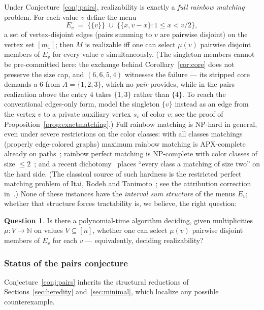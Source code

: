 \documentclass[11pt]{article}
\theoremstyle{definition}
\newtheorem{question}[theorem]{Question}
\theoremstyle{remark}
\newcommand{\N}{\mathbb{N}}
\newcommand{\intv}[1]{[#1]}
\begin{document}
Under Conjecture~\ref{conj:pairs}, realizability is exactly a \emph{full rainbow
matching} problem. For each value $v$ define the menu
\[
E_v \;=\; \bigl\{\{v\}\bigr\}\;\cup\;\bigl\{\{x,v-x\} : 1\le x<v/2\bigr\},
\]
a set of vertex-disjoint edges (pairs summing to $v$ are pairwise disjoint) on the
vertex set $\intv{m_1}$; then $M$ is realizable iff one can select $\mu(v)$ pairwise
disjoint members of $E_v$ for every value $v$ simultaneously. (The singleton
members cannot be pre-committed here: the exchange behind
Corollary~\ref{cor:core} does not preserve the size cap, and $(6,6,5,4)$
witnesses the failure --- its stripped core demands a $6$ from $A=\{1,2,3\}$,
which no \emph{pair} provides, while in the pairs realization above the entry
$4$ takes $\{1,3\}$ rather than $\{4\}$. To reach the conventional edges-only
form, model the singleton $\{v\}$ instead as an edge from the vertex $v$ to a
private auxiliary vertex $s_v$ of color $v$; see the proof of
Proposition~\ref{prop:exactmatching}.) Full rainbow matching
is NP-hard in general, even under severe restrictions on the color classes: with all
classes matchings (properly edge-colored graphs) maximum rainbow matching is
APX-complete already on paths~\cite{LePfender14}; rainbow perfect matching is
NP-complete with color classes of size $\le2$~\cite{KelkStamoulis19}; and a recent
dichotomy~\cite{HommelsheimJM26} places ``every class a matching of size two'' on
the hard side. (The classical source of such hardness is the restricted perfect
matching problem of Itai, Rodeh and Tanimoto~\cite{ItaiRodehTanimoto78}; see the
attribution correction in~\cite{deFigueiredoMSS22}.) None of these instances have
the \emph{interval sum structure} of the menus $E_v$; whether that structure forces
tractability is, we believe, the right question:

\begin{question}\label{q:rainbow}
Is there a polynomial-time algorithm deciding, given multiplicities
$\mu:V\to\N$ on values $V\subseteq\intv{n}$, whether one can select $\mu(v)$
pairwise disjoint members of $E_v$ for each $v$ --- equivalently, deciding
realizability?
\end{question}

\subsubsection*{Status of the pairs conjecture}

Conjecture~\ref{conj:pairs} inherits the structural reductions of
Sections~\ref{sec:heredity} and~\ref{sec:minimal}, which localize any
possible counterexample.
\end{document}
